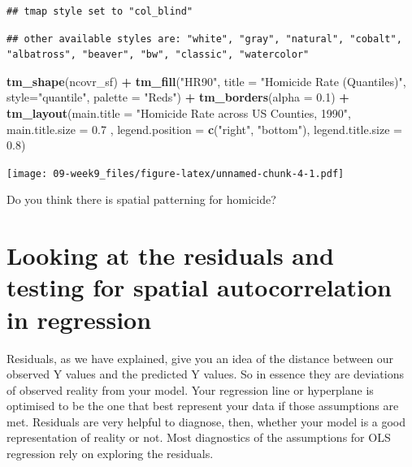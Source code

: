\documentclass[]{book}
\newenvironment{Shaded}{\begin{snugshade}}{\end{snugshade}}
\newcommand{\DataTypeTok}[1]{\textcolor[rgb]{0.13,0.29,0.53}{#1}}
\newcommand{\FloatTok}[1]{\textcolor[rgb]{0.00,0.00,0.81}{#1}}
\newcommand{\KeywordTok}[1]{\textcolor[rgb]{0.13,0.29,0.53}{\textbf{#1}}}
\newcommand{\NormalTok}[1]{#1}
\newcommand{\OperatorTok}[1]{\textcolor[rgb]{0.81,0.36,0.00}{\textbf{#1}}}
\newcommand{\StringTok}[1]{\textcolor[rgb]{0.31,0.60,0.02}{#1}}
\begin{document}
\begin{verbatim}
## tmap style set to "col_blind"
\end{verbatim}

\begin{verbatim}
## other available styles are: "white", "gray", "natural", "cobalt", "albatross", "beaver", "bw", "classic", "watercolor"
\end{verbatim}

\begin{Shaded}
\begin{Highlighting}[]
\KeywordTok{tm_shape}\NormalTok{(ncovr_sf) }\OperatorTok{+}\StringTok{ }
\StringTok{  }\KeywordTok{tm_fill}\NormalTok{(}\StringTok{"HR90"}\NormalTok{, }\DataTypeTok{title =} \StringTok{"Homicide Rate (Quantiles)"}\NormalTok{, }\DataTypeTok{style=}\StringTok{"quantile"}\NormalTok{, }\DataTypeTok{palette =} \StringTok{"Reds"}\NormalTok{) }\OperatorTok{+}
\StringTok{  }\KeywordTok{tm_borders}\NormalTok{(}\DataTypeTok{alpha =} \FloatTok{0.1}\NormalTok{) }\OperatorTok{+}
\StringTok{  }\KeywordTok{tm_layout}\NormalTok{(}\DataTypeTok{main.title =} \StringTok{"Homicide Rate across US Counties, 1990"}\NormalTok{, }\DataTypeTok{main.title.size =} \FloatTok{0.7}\NormalTok{ ,}
            \DataTypeTok{legend.position =} \KeywordTok{c}\NormalTok{(}\StringTok{"right"}\NormalTok{, }\StringTok{"bottom"}\NormalTok{), }\DataTypeTok{legend.title.size =} \FloatTok{0.8}\NormalTok{)}
\end{Highlighting}
\end{Shaded}

\texttt{[image: 09-week9\_files/figure-latex/unnamed-chunk-4-1.pdf]}

Do you think there is spatial patterning for homicide?

\hypertarget{looking-at-the-residuals-and-testing-for-spatial-autocorrelation-in-regression}{%
\section{Looking at the residuals and testing for spatial autocorrelation in regression}\label{looking-at-the-residuals-and-testing-for-spatial-autocorrelation-in-regression}}

Residuals, as we have explained, give you an idea of the distance between our observed Y values and the predicted Y values. So in essence they are deviations of observed reality from your model. Your regression line or hyperplane is optimised to be the one that best represent your data if those assumptions are met. Residuals are very helpful to diagnose, then, whether your model is a good representation of reality or not. Most diagnostics of the assumptions for OLS regression rely on exploring the residuals.
\end{document}
